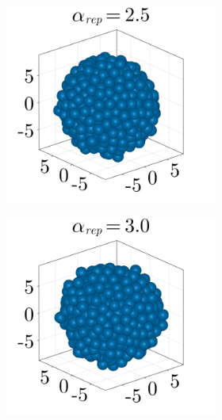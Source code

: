 \begin{figure}[ht]
\begin{subfigure}{\textwidth}
\begin{subfigure}{0.22\textwidth}
        \end{subfigure}
        \hfill
        \begin{subfigure}{0.22\textwidth}
            \centering
            \includegraphics[width=\textwidth]{figures/303/303-aggregates-reps-2dot5.png}
        \end{subfigure}
        \hfill
        \begin{subfigure}{0.22\textwidth}
            \centering
            \includegraphics[width=\textwidth]{figures/303/303-aggregates-reps-3.png}

\end{subfigure}
\end{subfigure}
\end{figure}
